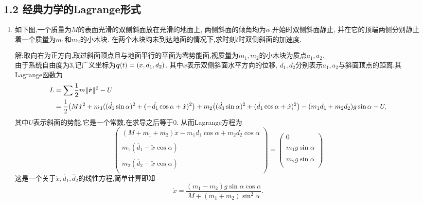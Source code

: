 \subsection{1.2 经典力学的Lagrange形式}
\begin{enumerate}
    \item 如下图,一个质量为$M$的表面光滑的双侧斜面放在光滑的地面上,
    两侧斜面的倾角均为$\alpha$.开始时双侧斜面静止,
    并在它的顶端两侧分别静止着一个质量为$m_1$和$m_2$的小木块.
    在两个木块均未到达地面的情况下,求时刻$t$时双侧斜面的加速度.


    解:取向右为正方向,取过斜面顶点且与地面平行的平面为零势能面,视质量为$m_1,m_2$的小木块为质点$a_1,a_2$.\\
    由于系统自由度为$3$,记广义坐标为$\boldsymbol{q}(t)=(x,d_1,d_2)$.
    其中$x$表示双侧斜面水平方向的位移,
    $d_1,d_2$分别表示$a_1,a_2$与斜面顶点的距离.其Lagrange函数为
    \begin{align*}
        L&=\sum\frac{1}{2}m\|\dot{\boldsymbol{r}}\|^2-U\\
        &=\frac{1}{2}\big(M\dot{x}^2+m_1((\dot{d_1}\sin\alpha)^2+(-\dot{d_1}\cos\alpha+\dot{x})^2\big)
         +m_2\big((\dot{d_1}\sin\alpha)^2+(\dot{d_1}\cos\alpha+\dot{x})^2\big)-(m_1d_1+m_2d_2)g\sin\alpha-U,\\
    \end{align*}
    其中$U$表示斜面的势能,它是一个常数,在求导之后等于$0$.
    从而Lagrange方程为
    $$\begin{pmatrix}
        (M+m_1+m_2)\ddot{x}-m_1\ddot{d_1}\cos\alpha+m_2\ddot{d_2}\cos\alpha\\ \\
        m_1(\ddot{d_1}-\ddot{x}\cos\alpha)\\ \\
        m_2(\ddot{d_2}-\ddot{x}\cos\alpha)\\
        \end{pmatrix}
        =\begin{pmatrix}0\\ \\m_1g\sin\alpha\\ \\m_2g\sin\alpha\\\end{pmatrix}$$
    这是一个关于$\ddot{x},\ddot{d_1},\ddot{d_2}$的线性方程,简单计算即知
    $$\ddot{x}=\frac{(m_1-m_2)g\sin\alpha\cos\alpha}{M+(m_1+m_2)\sin^2\alpha}.$$


\end{enumerate}

